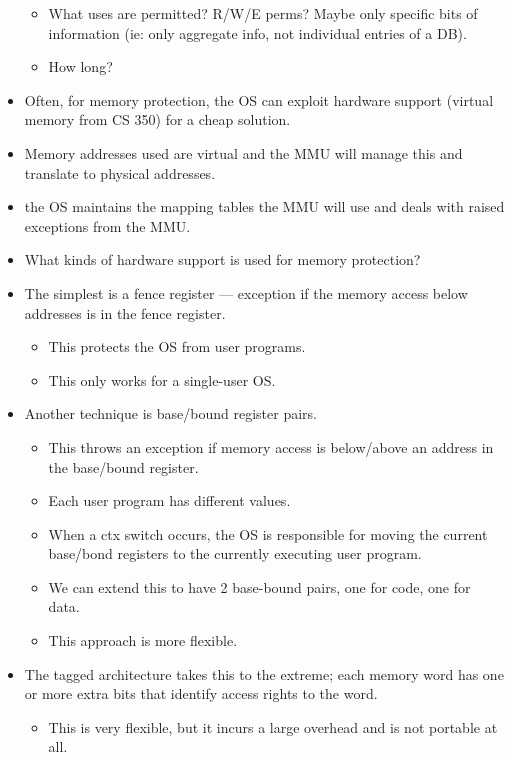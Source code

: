\documentclass{article}
\begin{document}
\begin{itemize}
\begin{itemize}
            \item What uses are permitted?  R/W/E perms?  Maybe only specific bits of information (ie: only aggregate info, not individual entries of a DB).
            \item How long?
        \end{itemize}
    \item Often, for memory protection, the OS can exploit hardware support (virtual memory from CS 350) for a cheap solution.
    \item Memory addresses used are virtual and the MMU will manage this and translate to physical addresses.
    \item the OS maintains the mapping tables the MMU will use and deals with raised exceptions from the MMU.
    \item What kinds of hardware support is used for memory protection?
    \item The simplest is a fence register --- exception if the memory access below addresses is in the fence register.
    \begin{itemize}
        \item This protects the OS from user programs.
        \item This only works for a single-user OS.
    \end{itemize}
    \item Another technique is base/bound register pairs.
        \begin{itemize}
            \item This throws an exception if memory access is below/above an address in the base/bound register.
            \item Each user program has different values.
            \item When a ctx switch occurs, the OS is responsible for moving the current base/bond registers to the currently executing user program.
            \item We can extend this to have 2 base-bound pairs, one for code, one for data.
            \item This approach is more flexible.
        \end{itemize}
    \item The tagged architecture takes this to the extreme; each memory word has one or more extra bits that identify access rights to the word.
        \begin{itemize}
            \item This is very flexible, but it incurs a large overhead and is not portable at all.

\end{itemize}
\end{itemize}
\end{document}
